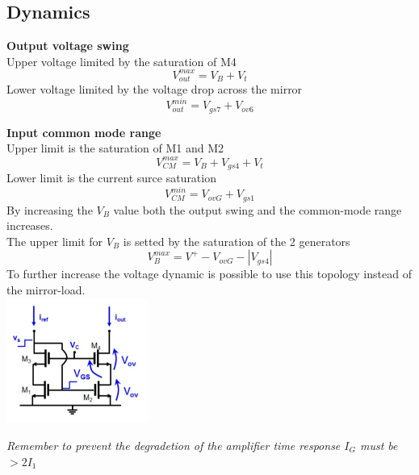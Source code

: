 \subsection{Dynamics}
{\bf Output voltage swing}\\
Upper voltage limited by the saturation of M4
\begin{equation}
V_{out}^{max}=V_B+V_t
\end{equation}
Lower voltage limited by the voltage drop across the mirror
\begin{equation}
V_{out}^{min}=V_{gs7}+V_{ov6}
\end{equation}

{\bf Input common mode range}\\
Upper limit is the saturation of M1 and M2
\begin{equation}
V_{CM}^{max}=V_B+V_{gs4}+V_t
\end{equation}
Lower limit is the current surce saturation
\begin{equation}
V_{CM}^{min}=V_{ovG}+V_{gs1}
\end{equation}
By increasing the $V_B$ value both the output swing and the common-mode range increases.\\
The upper limit for $V_B$ is setted by the saturation of the 2 generators
\begin{equation}
V_{B}^{max}=V^+-V_{ovG}-|V_{gs4}|
\end{equation}
To further increase the voltage dynamic is possible to use this topology instead of the mirror-load.\\

\centering
\includegraphics[width=0.35\textwidth]{mirrorload.png}\\
\raggedright

{\it Remember to prevent the degradetion of the amplifier time response $I_G$ must be $>2I_1$}










